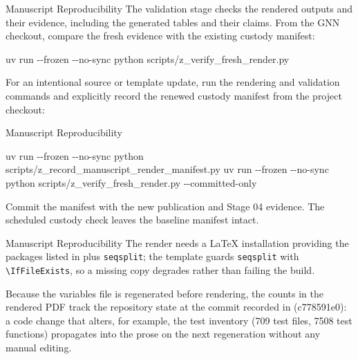 \documentclass[
  ignorenonframetext,
]{beamer}
\newenvironment{Shaded}{}{}
\newcommand{\AttributeTok}[1]{\textcolor[rgb]{0.49,0.56,0.16}{#1}}
\newcommand{\ExtensionTok}[1]{#1}
\newcommand{\NormalTok}[1]{#1}
\begin{document}
\begin{frame}{Manuscript Reproducibility}
The validation stage checks the rendered outputs and their evidence,
including the generated tables and their claims. From the GNN checkout,
compare the fresh evidence with the existing custody manifest:

\begin{Shaded}
\begin{Highlighting}[]
\ExtensionTok{uv}\NormalTok{ run }\AttributeTok{{-}{-}frozen} \AttributeTok{{-}{-}no{-}sync}\NormalTok{ python scripts/z\_verify\_fresh\_render.py}
\end{Highlighting}
\end{Shaded}

For an intentional source or template update, run the rendering and
validation commands and explicitly record the renewed custody manifest
from the project checkout:

\end{frame}

\begin{frame}{Manuscript Reproducibility}
\begin{Shaded}
\begin{Highlighting}[]
\ExtensionTok{uv}\NormalTok{ run }\AttributeTok{{-}{-}frozen} \AttributeTok{{-}{-}no{-}sync}\NormalTok{ python scripts/z\_record\_manuscript\_render\_manifest.py}
\ExtensionTok{uv}\NormalTok{ run }\AttributeTok{{-}{-}frozen} \AttributeTok{{-}{-}no{-}sync}\NormalTok{ python scripts/z\_verify\_fresh\_render.py }\AttributeTok{{-}{-}committed{-}only}
\end{Highlighting}
\end{Shaded}

Commit the manifest with the new publication and Stage 04 evidence. The
scheduled custody check leaves the baseline manifest intact.

\end{frame}

\begin{frame}{Manuscript Reproducibility}
The render needs a LaTeX installation providing the packages listed in
 plus \texttt{seqsplit}; the
template guards \texttt{seqsplit} with
\texttt{\textbackslash{}IfFileExists}, so a missing copy degrades rather
than failing the build.

Because the variables file is regenerated before rendering, the counts
in the rendered PDF track the repository state at the commit recorded in
 (c778591e0): a code
change that alters, for example, the test inventory (709 test files,
7508 test functions) propagates into the prose on the next regeneration
without any manual editing.
\end{frame}
\end{document}

